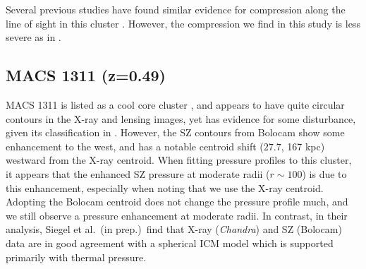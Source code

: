 \documentclass[iop,numberedappendix,apj]{emulateapj}
\begin{document}
Several previous studies have found similar evidence for compression along the line of sight in this cluster
\citep[e.g.][and references therein]{plagge2013}. However, the compression we find in this study is less 
severe as in \citet{plagge2013}.


\subsection{MACS 1311 (z=0.49)}
\label{sec:results_m1311}



MACS 1311 is listed as a cool core cluster \citep[e.g.][]{sayers2013}, and appears to have quite circular
contours in the X-ray and lensing images, yet has evidence for some disturbance, given its classification
in \citet{mann2012}. However, the SZ contours from Bolocam show some enhancement  to the west, and has
a notable centroid shift ($27.7$\asec, 167 kpc) westward from the X-ray centroid. When fitting pressure profiles
to this cluster, it appears that the enhanced SZ pressure at moderate radii ($r \sim 100$\asec) is due
to this enhancement, especially when noting that we use the X-ray centroid. Adopting the Bolocam centroid
does not change the pressure profile much, and we still observe a pressure enhancement at moderate radii.
In contrast, in their analysis, %
Siegel et al.\ (in prep.)\ find that X-ray (\emph{Chandra}) and SZ (Bolocam) data 
are in good agreement with a spherical ICM model which is supported primarily with thermal pressure.

\end{document}
